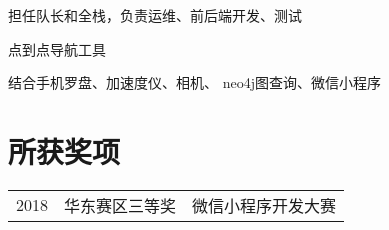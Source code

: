 \documentclass[]{deedy-resume-openfont}
\begin{document}
\begin{minipage}[t]{0.73\textwidth}
\sectionsep

\begin{tightemize}
    \item 担任队长和全栈，负责运维、前后端开发、测试
    \item 点到点导航工具
    \item 结合手机罗盘、加速度仪、相机、 neo4j图查询、微信小程序
\end{tightemize}
\sectionsep




\section{所获奖项} 
\begin{tabular}{rll}
2018         & 华东赛区三等奖  & 微信小程序开发大赛 \\
\end{tabular}
\sectionsep


% 
% 

\end{minipage} 
\end{document}
